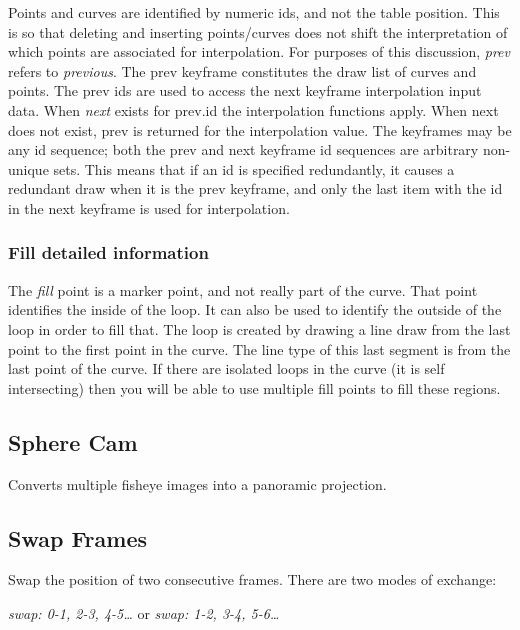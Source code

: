 {Points and curves are identified by numeric ids, and not the table position. This is so that deleting and inserting points/curves does not shift the interpretation of which points are associated for interpolation. For purposes of this discussion, \textit{prev} refers to \textit{previous}. The prev keyframe constitutes the draw list of curves and points. The prev ids are used to access the next keyframe interpolation input data. When \textit{next} exists for prev.id the interpolation functions apply. When next does not exist, prev is returned for the interpolation value. The keyframes may be any id sequence; both the prev and next keyframe id sequences are arbitrary non-unique sets. This means that if an id is specified redundantly, it causes a redundant draw when it is the prev keyframe, and only the last item with the id in the next keyframe is used for interpolation.

\subsubsection*{Fill detailed information}%
\label{ssub:fill_detailed_information}

The \textit{fill} point is a marker point, and not really part of the curve. That point identifies the inside of the loop. It can also be used to identify the outside of the loop in order to fill that. The loop is created by drawing a line draw from the last point to the first point in the curve. The line type of this last segment is from the last point of the curve. If there are isolated loops in the curve (it is self intersecting) then you will be able to use multiple fill points to fill these regions.

\subsection{Sphere Cam}%
\label{sub:sphere_cam}

Converts multiple fisheye images into a panoramic projection.

\subsection{Swap Frames}%
\label{sub:swap_frames}

Swap the position of two consecutive frames. There are two modes of exchange:

\qquad \textit{swap: 0-1, 2-3, 4-5\dots} \qquad or \qquad \textit{swap: 1-2, 3-4, 5-6\dots}

}
